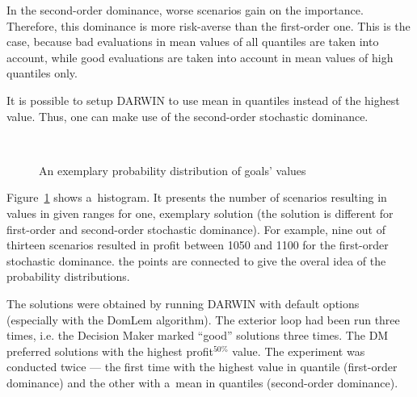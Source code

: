 In the second-order dominance, worse scenarios gain on the
importance. Therefore, this dominance is more risk-averse than the first-order
one. This is the case, because bad evaluations in mean values of all quantiles
are taken into account, while good evaluations are taken into account in mean
values of high quantiles only.

It is possible to setup DARWIN to use mean in quantiles instead of the highest
value. Thus, one can make use of the second-order stochastic dominance.

\begin{figure}[t]
  \centering
    \\
    \caption{An exemplary probability distribution of goals' values}
  \label{dom_comparision}
\end{figure}

Figure~\ref{dom_comparision} shows a~histogram. It presents the number of
scenarios resulting in values in given ranges for one, exemplary solution (the
solution is different for first-order and second-order stochastic
dominance). For example, nine out of thirteen scenarios resulted in profit
between 1050 and 1100 for the first-order stochastic dominance. the points are
connected to give the overal idea of the probability distributions.

The solutions were obtained by running DARWIN with default options
(especially with the DomLem algorithm). The exterior loop had been run three
times, i.e. the Decision Maker marked ``good'' solutions three times. The DM
preferred solutions with the highest profit$^{50\%}$ value. The experiment was
conducted twice --- the first time with the highest value in quantile
(first-order dominance) and the other with a~mean in quantiles (second-order
dominance).

